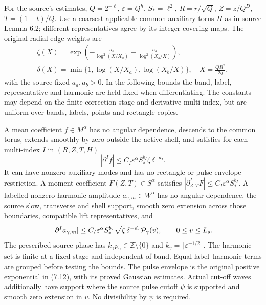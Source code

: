 For the source's estimates, $Q=2^{-\ell}$, $\varepsilon=Q^h$,
$S_*=\ell^2$, $R=r/\sqrt Q$, $Z=z/Q^D$, $T=(1-t)/Q$.
Use a coarsest applicable common auxiliary torus $H$ as in source
Lemma 6.2; different representatives agree by its integer covering
maps. The original radial edge weights are
\[
\begin{gathered}
 \zeta(X)=\exp\left(-\frac{a_a}{\log^2(X/X_a)}
                       -\frac{a_b}{\log^2(X_b/X)}\right),\\
 \delta(X)=\min\{1,\log(X/X_a),\log(X_b/X)\},
 \quad X=\frac{QR^2}{2q},
\end{gathered}
\]
with the source fixed $a_a,a_b>0$. In the following bounds the band,
label, representative and harmonic are held fixed when differentiating.
The constants may depend on the finite correction stage and derivative
multi-index, but are uniform over bands, labels, points and rectangle
copies.

A mean coefficient $f\in M^\alpha$ has no angular dependence, descends
to the common torus, extends smoothly by zero outside the active shell,
and satisfies for each multi-index $I$ in $(R,Z,T,H)$
\[
 |\partial^If|\le C_I\varepsilon^\alpha S_*^{b_I}
                                        \zeta\,\delta^{-d_I}.
\]
It can have nonzero auxiliary modes and has no rectangle or pulse
envelope restriction. A moment coefficient $F(Z,T)\in S^\alpha$
satisfies $|\partial_{Z,T}^IF|\le C_I\varepsilon^\alpha S_*^{b_I}$.
A labelled nonzero harmonic amplitude $a_{\gamma,m}\in W^\alpha$
has no angular dependence, the source slow, transverse and shell
support, smooth zero extension across those boundaries, compatible
lift representatives, and
\[
 |\partial^Ia_{\gamma,m}|\le
 C_I\varepsilon^\alpha S_*^{b_I}\sqrt\zeta\,\delta^{-d_I}
                          {\cal P}_\gamma(v),\qquad 0\le v\le L_s.
\]
The prescribed source phase has $k_\gamma p_\gamma\in
\mathbb Z\setminus\{0\}$ and $k_\gamma=\lceil\varepsilon^{-1/2}\rceil$.
The harmonic set is finite at a fixed stage and independent of band.
Equal label--harmonic terms are grouped before testing the bounds.
The pulse envelope is the original positive exponential in (7.12),
with its proved Gaussian estimates. Actual cut-off waves additionally
have support where the source pulse cutoff $\psi$ is supported and
smooth zero extension in $v$. No divisibility by $\psi$ is required.

